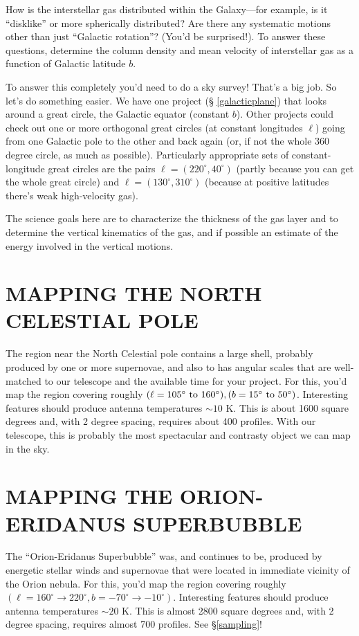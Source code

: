 \documentclass[psfig,preprint]{aastex}
\begin{document}
How is the interstellar gas distributed within the Galaxy---for example,
is it ``disklike'' or more spherically distributed? Are there any
systematic motions other than just ``Galactic rotation''? (You'd be
surprised!).  To answer these questions, determine the column density
and mean velocity of interstellar gas as a function of Galactic latitude
$b$. 

	To answer this completely you'd need to do a sky survey! That's
a big job.  So let's do something easier. We have one project (\S
\ref{galacticplane}) that looks around a great circle, the Galactic
equator (constant $b$). Other projects could check out one or more
orthogonal great circles (at constant longitudes $\ell$) going from one
Galactic pole to the other and back again (or, if not the whole 360
degree circle, as much as possible).  Particularly appropriate sets of
constant-longitude great circles are the pairs $\ell = (220^\circ,
40^\circ)$ (partly because you can get the whole great circle) and $\ell
= (130^\circ, 310^\circ)$ (because at positive latitudes there's weak
high-velocity gas).

	The science goals here are to characterize the thickness of the
gas layer and to determine the vertical kinematics of the gas, and if
possible an estimate of the energy involved in the vertical motions.

\section{MAPPING THE NORTH CELESTIAL POLE} \label{celestial}

The region near the North Celestial pole contains a large shell,
probably produced by one or more supernovae, and also to has angular
scales that are well-matched to our telescope and the available time for
your project. For this, you'd map the region covering roughly
$(\ell=105^\circ \ {\rm to} \ 160^\circ), (b=15^\circ \ {\rm to}
\ 50^\circ)$. Interesting features should produce antenna temperatures
$\sim 10$ K. This is about 1600 square degrees and, with 2 degree
spacing, requires about 400 profiles. With our telescope, this is
probably the most spectacular and contrasty object we can map in the
sky.

\section{MAPPING THE ORION-ERIDANUS SUPERBUBBLE} \label{eridanus}

The ``Orion-Eridanus Superbubble'' was, and continues to be, produced by
energetic stellar winds and supernovae that were located in immediate
vicinity of the Orion nebula. For this, you'd map the region covering
roughly $(\ell=160^\circ \rightarrow 220^\circ, b=-70^\circ \rightarrow
-10^\circ)$. Interesting features should produce antenna temperatures
$\sim 20$ K. This is almost 2800 square degrees and, with 2 degree
spacing, requires almost 700 profiles. See \S \ref{sampling}!
\end{document}
